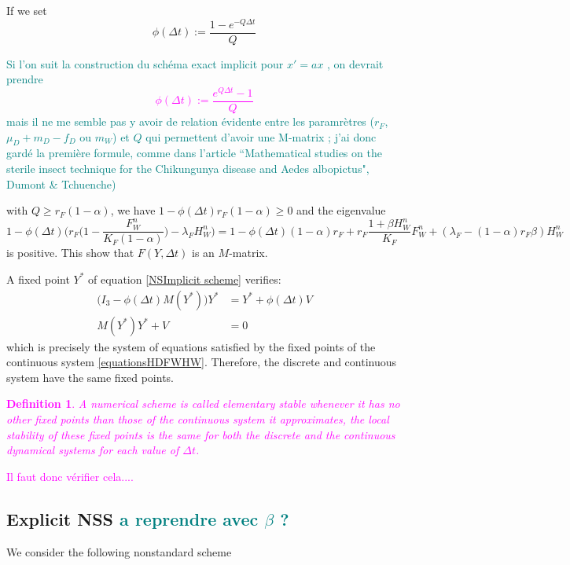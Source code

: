 \documentclass{article}
\newcommand{\lfw}{\lambda_{F}}
\newcommand{\lfw}{\lambda_{F}}
\newcommand{\marc}[1]{\textcolor{teal}{#1}}
\newcommand{\YD}[1]{\textcolor{magenta}{#1}}
\newtheorem{definition}{Definition}
\begin{document}
If we set
\begin{equation}
\phi(\Delta t) := \dfrac{1- e^{-Q \Delta t}}{Q}
\end{equation}

\marc{Si l'on suit la construction du schéma exact implicit pour $x' = a x$ , on devrait prendre
\YD{
\begin{equation}
\phi(\Delta t) := \dfrac{e^{Q \Delta t} - 1}{Q}
\end{equation}}
mais il ne me semble pas y avoir de relation évidente entre les paramrètres ($r_F$, $\mu_D+m_D-f_D$ ou $m_W$) et $Q$ qui permettent d'avoir une M-matrix ; j'ai donc gardé la première formule, comme dans l'article ``Mathematical studies on the sterile insect technique for the Chikungunya disease and Aedes albopictus", Dumont \& Tchuenche)
}

with $Q \geq r_F(1 - \alpha)$, we have $1 - \phi(\Delta t)r_F(1-\alpha) \geq 0$ and the eigenvalue $$1 - \phi(\Delta t) \Big(r_F\Big(1 - \dfrac{F_W^n}{K_F(1 - \alpha)} \Big) - \lfw H_W^n \Big) = 1 - \phi(\Delta t)(1-\alpha)r_F + r_F \dfrac{1 + \beta H_W^n}{K_F}F^n_W + (\lfw - (1-\alpha) r_F  \beta) H^n_W $$ is positive. This show that $F(Y, \Delta t)$ is an $M$-matrix.

\medskip
A fixed point $Y^*$ of equation \eqref{NSImplicit scheme} verifies:
\begin{align*}
\Big(I_3 - \phi(\Delta t) M(Y^*) \Big) Y^* &= Y^* + \phi(\Delta t)V \\
 M(Y^*) Y^* + V&= 0
\end{align*}
which is precisely the system of equations satisfied by the fixed points of the continuous system \eqref{equationsHDFWHW}. Therefore, the discrete and continuous system have the same fixed points.

\YD{
\begin{definition}
A numerical scheme is called elementary stable whenever it has no other fixed points than those of the continuous system it approximates, the local stability of these fixed points is the same for both the discrete and the continuous dynamical systems for each value of $\Delta t$.
\end{definition}
Il faut donc vérifier cela....
}

\subsection{Explicit NSS \marc{a reprendre avec $\beta$ ?}}
 We consider the following nonstandard scheme
\end{document}
